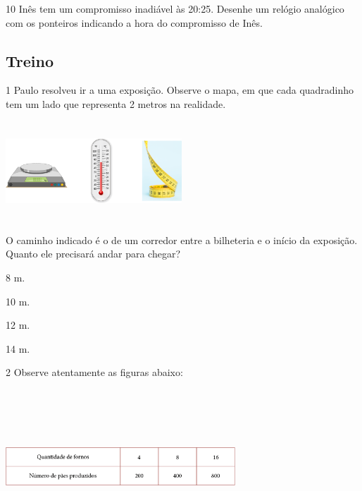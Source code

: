 \begin{mdframed}[linewidth=2pt,linecolor=salmao,roundcorner=2pt]

\num{10} Inês tem um compromisso inadiável às 20:25. Desenhe um relógio analógico
com os ponteiros indicando a hora do compromisso de Inês.

\begin{mdframed}[linewidth=2pt,linecolor=salmao,roundcorner=2pt]
\vspace{7cm}
\end{mdframed}


\subsection{Treino}

\num{1} Paulo resolveu ir a uma exposição. Observe o mapa, em que cada quadradinho tem um lado que representa 2 metros na realidade.

\includegraphics[width=2.60897in,height=1.46587in]{media/image70.png}

O caminho indicado é o de um corredor entre a bilheteria e o início da exposição.
Quanto ele precisará andar para chegar?

\begin{escolha}
\item
  8 m.
\item
  10 m.
\item
  12 m.
\item
  14 m.
\end{escolha}


\num{2} Observe atentamente as figuras abaixo:

\includegraphics[width=3.39196in,height=2.27520in]{media/image71.png}


\end{mdframed}
